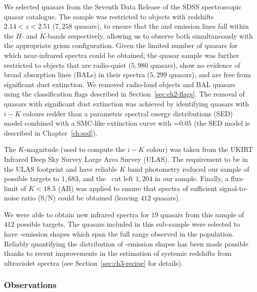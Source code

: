 We selected quasars from the Seventh Data Release \citep[DR7;][]{schneider10} of the SDSS spectroscopic quasar catalogue.  
The sample was restricted to objects with redshifts $2.14 < z <2.51$ ($7,258$ quasars), to ensure that the \hb and \ha emission lines fall within the $H$- and $K$-bands respectively, allowing us to observe both simultaneously with the appropriate grism configuration.
Given the limited number of quasars for which near-infrared spectra could be obtained, the quasar sample was further restricted to objects that are radio-quiet ($5,980$ quasars), show no evidence of broad absorption lines (BALs) in their spectra ($5,299$ quasars), and are free from significant dust extinction. 
We removed radio-loud objects and BAL quasars using the classification flags described in Section~\ref{sec:ch2-flags}. 
The removal of quasars with significant dust extinction was achieved by identifying quasars with $i-K$ colours redder than a parametric spectral energy distributions (SED) model combined with a SMC-like extinction curve with \ebv=$0.05$ (the SED model is described in Chapter~\ref{ch:sed}). 

The $K$-magnitude (used to compute the $i-K$ colour) was taken from the UKIRT Infrared Deep Sky Survey \citep[UKIDSS;][]{lawrence07} Large Area Survey (ULAS). 
The requirement to be in the ULAS footprint and have reliable $K$ band photometry reduced our sample of possible targets to $1,683$, and the \ebv\, cut left $1,204$ in our sample. 
Finally, a flux-limit of $K<18.5$ (AB) was applied to ensure that spectra of sufficient signal-to-noise ratio (S/N) could be obtained (leaving $412$ quasars). 
 
We were able to obtain new infrared spectra for $19$ quasars from this sample of $412$ possible targets. 
The quasars included in this sub-sample were selected to have -emission shapes which span the full range observed in the population. 
Reliably quantifying the distribution of -emission shapes has been made possible thanks to recent improvements in the estimation of systemic redshifts from ultraviolet spectra (see Section~\ref{sec:ch3-recipe} for details). 

\subsubsection{Observations}

